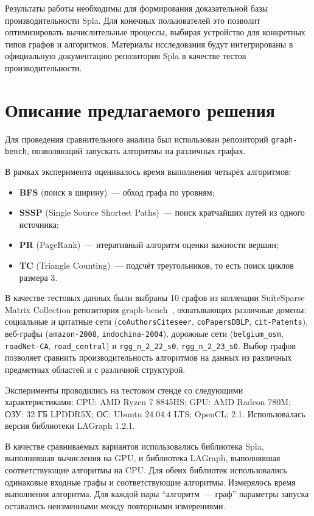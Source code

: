 \documentclass[a4paper]{article}
\begin{document}
	Результаты работы необходимы для формирования доказательной базы производительности Spla. Для конечных пользователей это позволит оптимизировать вычислительные процессы, выбирая устройство для конкретных типов графов и алгоритмов. Материалы исследования будут интегрированы в официальную документацию репозитория Spla в качестве тестов производительности.
	
	\section{Описание предлагаемого решения}
	
	Для проведения сравнительного анализа был использован репозиторий \texttt{graph-bench}, позволяющий запускать алгоритмы на различных графах.
	
	В рамках эксперимента оценивалось время выполнения четырёх алгоритмов:
	\begin{itemize}[noitemsep]
		\item \textbf{BFS} (поиск в ширину)~--- обход графа по уровням;
		\item \textbf{SSSP} (Single Source Shortest Paths)~--- поиск кратчайших путей из одного источника;
		\item \textbf{PR} (PageRank)~--- итеративный алгоритм оценки важности вершин;
		\item \textbf{TC} (Triangle Counting)~--- подсчёт треугольников, то есть поиск циклов размера 3.
	\end{itemize}
	
	В качестве тестовых данных были выбраны 10 графов из коллекции SuiteSparse Matrix Collection репозитория graph-bench~\cite{graph-bench}, охватывающих различные домены: социальные и цитатные сети (\texttt{coAuthorsCiteseer}, \texttt{coPapersDBLP}, \texttt{cit-Patents}), веб-графы (\texttt{amazon-2008}, \texttt{indochina-2004}), дорожные сети (\texttt{belgium\_osm}, \texttt{roadNet-CA}, \texttt{road\_central}) и \texttt{rgg\_n\_2\_22\_s0}, \texttt{rgg\_n\_2\_23\_s0}. Выбор графов позволяет сравнить производительность алгоритмов на данных из различных предметных областей и с различной структурой.
	
	Эксперименты проводились на тестовом стенде со следующими характеристиками: CPU: AMD Ryzen 7 8845HS; GPU: AMD Radeon 780M; ОЗУ: 32 ГБ LPDDR5X; ОС: Ubuntu 24.04.4 LTS; OpenCL: 2.1. Использовалась версия библиотеки LAGraph 1.2.1.
	
	
	
	В качестве сравниваемых вариантов использовались библиотека Spla,
	выполнявшая вычисления на GPU, и библиотека LAGraph, выполнявшая
	соответствующие алгоритмы на CPU. Для обеих библиотек использовались
	одинаковые входные графы и соответствующие алгоритмы. Измерялось
	время выполнения алгоритма. Для каждой пары \enquote{алгоритм~--- граф}
	параметры запуска оставались неизменными между повторными измерениями.
	
\end{document}
